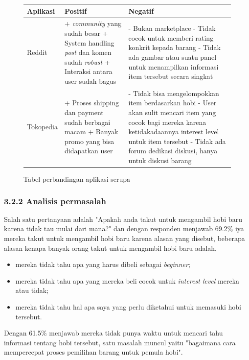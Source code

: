 \documentclass[a4paper]{article}
\begin{document}
\newpage
\begin{figure}[h]
    \begin{longtable}{|m{2cm}|p{5cm}|p{5cm}|}
        \hline
        Aplikasi & Positif                                                     & Negatif             \\
        \hline
        Reddit
                 & + \textit{community} yang sudah besar \newline
        + System handling \textit{post} dan komen sudah \textit{robust} \newline
        + Interaksi antara user sudah bagus
                 & - Bukan marketplace \newline
        - Tidak cocok untuk memberi rating konkrit kepada barang \newline
        - Tidak ada gambar atau suatu panel untuk menampilkan informasi item tersebut secara singkat \\
        \hline
        Tokopedia
                 & + Proses shipping dan payment sudah berbagai macam \newline
        + Banyak promo yang bisa didapatkan user
                 & - Tidak bisa mengelompokkan item berdasarkan hobi \newline
        - User akan sulit mencari item yang cocok bagi mereka karena ketidakadaannya interest level untuk item tersebut \newline
        - Tidak ada forum dedikasi diskusi, hanya untuk diskusi barang                               \\
        \hline
    \end{longtable}
    \caption{Tabel perbandingan aplikasi serupa}
\end{figure}

\subsubsection*{3.2.2 Analisis permasalah}
Salah satu pertanyaan adalah "Apakah anda takut untuk mengambil hobi baru karena tidak tau mulai dari mana?" dan dengan responden menjawab 69.2\% iya mereka takut untuk mengambil hobi baru karena alasan yang disebut, beberapa alasan kenapa banyak orang takut untuk mengambil hobi baru adalah,
\begin{itemize}
    \item mereka tidak tahu apa yang harus dibeli sebagai \textit{beginner};
    \item mereka tidak tahu apa yang mereka beli cocok untuk \textit{interest level} mereka atau tidak;
    \item mereka tidak tahu hal apa saya yang perlu diketahui untuk memasuki hobi tersebut.
\end{itemize}
Dengan 61.5\% menjawab mereka tidak punya waktu untuk mencari tahu informasi tentang hobi tersebut, satu masalah muncul yaitu "bagaimana cara mempercepat proses pemilihan barang untuk pemula hobi".
\end{document}
